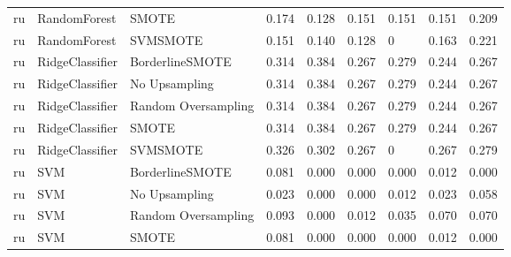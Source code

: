 \begin{tabular}{lllllllll}
      ru &                 RandomForest &               SMOTE & 0.174 &                     0.128 &                 0.151 &                  0.151 &                                   0.151 &     0.209 \\
      ru &                 RandomForest &            SVMSMOTE & 0.151 &                     0.140 &                 0.128 &                      0 &                                   0.163 &     0.221 \\
      ru &              RidgeClassifier &     BorderlineSMOTE & 0.314 &                     0.384 &                 0.267 &                  0.279 &                                   0.244 &     0.267 \\
      ru &              RidgeClassifier &       No Upsampling & 0.314 &                     0.384 &                 0.267 &                  0.279 &                                   0.244 &     0.267 \\
      ru &              RidgeClassifier & Random Oversampling & 0.314 &                     0.384 &                 0.267 &                  0.279 &                                   0.244 &     0.267 \\
      ru &              RidgeClassifier &               SMOTE & 0.314 &                     0.384 &                 0.267 &                  0.279 &                                   0.244 &     0.267 \\
      ru &              RidgeClassifier &            SVMSMOTE & 0.326 &                     0.302 &                 0.267 &                      0 &                                   0.267 &     0.279 \\
      ru &                          SVM &     BorderlineSMOTE & 0.081 &                     0.000 &                 0.000 &                  0.000 &                                   0.012 &     0.000 \\
      ru &                          SVM &       No Upsampling & 0.023 &                     0.000 &                 0.000 &                  0.012 &                                   0.023 &     0.058 \\
      ru &                          SVM & Random Oversampling & 0.093 &                     0.000 &                 0.012 &                  0.035 &                                   0.070 &     0.070 \\
      ru &                          SVM &               SMOTE & 0.081 &                     0.000 &                 0.000 &                  0.000 &                                   0.012 &     0.000 \\

\end{tabular}
